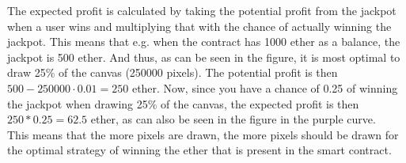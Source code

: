 \documentclass[a4paper]{article}
\begin{document}
The expected profit is calculated by taking the potential profit from the jackpot when a user wins and multiplying that with the chance of actually winning the jackpot. This means that e.g. when the contract has 1000 ether as a balance, the jackpot is 500 ether. And thus, as can be seen in the figure, it is most optimal to draw 25\% of the canvas (250000 pixels). The potential profit is then $500 - 250000 \cdot 0.01 = 250$ ether. Now, since you have a chance of 0.25 of winning the jackpot when drawing 25\% of the canvas, the expected profit is then $250 * 0.25 = 62.5$ ether, as can also be seen in the figure in the purple curve. \\
This means that the more pixels are drawn, the more pixels should be drawn for the optimal strategy of winning the ether that is present in the smart contract.
\end{document}
